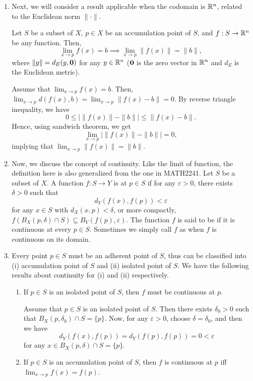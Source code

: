 \begin{enumerate}
\item Next, we will consider a result applicable when the codomain is \(\mathbb{R}^n\),
related to the Euclidean norm \(\|\cdot\|\).
\begin{proposition}
\label{prp:lim-norm}
Let \(S\) be a subset of \(X\), \(p\in X\) be an accumulation point of \(S\),
and \(f:S\to\mathbb{R}^n\) be any function. Then,
\[
\lim_{x\to p}f(x)=b\implies \lim_{x\to p}\|f(x)\|=\|b\|,
\]
where \(\|y\|=d_E(y,\vb*{0})\) for any \(y\in\mathbb{R}^n\) (\(\vb*{0}\) is
the zero vector in \(\mathbb{R}^n\) and \(d_E\) is the Euclidean metric).
\end{proposition}
\begin{pf}
Assume that \(\lim_{x\to p}f(x)=b\). Then, \(\lim_{x\to
p}d(f(x),b)=\lim_{x\to p}\|f(x)-b\|=0\). By reverse triangle inequality, we
have
\[
0\le \big|\|f(x)\|-\|b\|\big|\le \|f(x)-b\|.
\]
Hence, using sandwich theorem, we get
\[
\lim_{x\to p}\big|\|f(x)\|-\|b\|\big|=0,
\]
implying that \(\lim_{x\to p}\|f(x)\|=\|b\|\).
\end{pf}
\item Now, we discuss the concept of continuity. Like the limit of function,
the definition here is also generalized from the one in MATH2241. Let \(S\) be
a subset of \(X\). A function \(f:S\to Y\) is  at \(p\in S\)
if for any \(\varepsilon>0\), there exists \(\delta>0\) such that
\[d_Y(f(x),f(p))<\varepsilon\]
for any
\(x\in S\) with \(d_X(x,p)<\delta\), or more compactly,
\(f(B_X(p,\delta)\cap S)\subseteq B_Y(f(p),\varepsilon)\).
The function \(f\) is said to be  if it is continuous
at every \(p\in S\). Sometimes we simply call \(f\) as  when
\(f\) is continuous on its domain.

\item  Every point \(p\in S\) must be an adherent
point of \(S\), thus can be classified into (i) accumulation point of \(S\) and
(ii) isolated point of \(S\). We have the following results about continuity
for (i) and (ii) respectively.
\begin{enumerate}
\item \label{it:cts-isolate} If \(p\in S\) is an isolated point of \(S\), then \(f\) must be
continuous at \(p\).

\begin{pf}
Assume that \(p\in S\) is an isolated point of \(S\). Then there exists
\(\delta_0>0\) such that \(B_X(p,\delta_0)\cap S=\{p\}\). Now, for any
\(\varepsilon>0\), choose \(\delta=\delta_0\), and then we have
\[
d_Y(f(x),f(p))=d_Y(f(p),f(p))=0<\varepsilon
\]
for any \(x\in B_X(p,\delta)\cap S=\{p\}\).
\end{pf}
\item \label{it:cts-acc} If \(p\in S\) is an accumulation point of \(S\), then \(f\) is continuous
at \(p\) iff \(\lim_{x\to p}f(x)=f(p)\).


\end{enumerate}
\end{enumerate}
